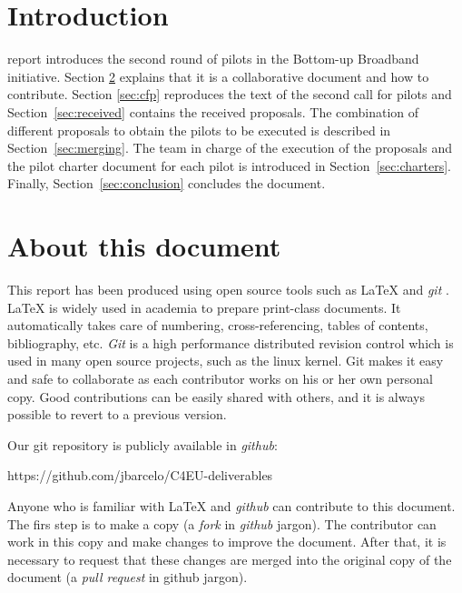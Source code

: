 \documentclass[draftclsnofoot,12pt,journal,onecolumn]{IEEEtran}
\begin{document}
\section{Introduction}
% 
% 
% 
% 
 report introduces the second round of pilots in the Bottom-up Broadband initiative.
Section \ref{sec:about} explains that it is a collaborative document and how to contribute.
Section \ref{sec:cfp} reproduces the text of the second call for pilots and Section~\ref{sec:received} contains the received proposals.
The combination of different proposals to obtain the pilots to be executed is described in Section~\ref{sec:merging}.
The team in charge of the execution of the proposals and the pilot charter document for each pilot is introduced in Section~\ref{sec:charters}.
Finally, Section~\ref{sec:conclusion} concludes the document.


\section{About this document}
\label{sec:about}

This report has been produced using open source tools such as {\LaTeX} \cite{lamport1994ldp} and \emph{git} \cite{chacon2009pg}.
{\LaTeX} is widely used in academia to prepare print-class documents.
It automatically takes care of numbering, cross-referencing, tables of contents, bibliography, etc.
\emph{Git} is a high performance distributed revision control which is used in many open source projects, such as the linux kernel.
Git makes it easy and safe to collaborate as each contributor works on his or her own personal copy.
Good contributions can be easily shared with others, and it is always possible to revert to a previous version.

Our git repository is publicly available in \emph{github}:

https://github.com/jbarcelo/C4EU-deliverables

Anyone who is familiar with {\LaTeX} and \emph{github} can contribute to this document.
The firs step is to make a copy (a \emph{fork} in \emph{github} jargon).
The contributor can work in this copy and make changes to improve the document.
After that, it is necessary to request that these changes are merged into the original copy of the document (a \emph{pull request} in github jargon).
\end{document}
